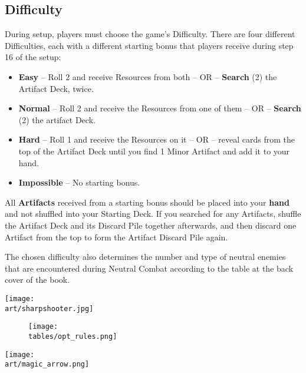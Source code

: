\begin{multicols}{2}

\subsection*{\hypertarget{Difficulty}{Difficulty}}
During setup, players must choose the game's Difficulty.
There are four different Difficulties, each with a different starting bonus that players receive during step 16 of the setup:
\begin{itemize}
  \item \textbf{Easy} – Roll 2  and receive Resources from both – OR – \textbf{Search} (2) the Artifact Deck, twice.
  \item \textbf{Normal} – Roll 2  and receive the Resources from one of them – OR – \textbf{Search} (2) the artifact Deck.
  \item \textbf{Hard} – Roll 1  and receive the Resources on it – OR – reveal cards from the top of the Artifact Deck until you find 1 Minor Artifact and add it to your hand.
  \item \textbf{Impossible} – No starting bonus.
\end{itemize}


All \textbf{Artifacts} received from a starting bonus should be placed into your \textbf{hand} and not shuffled into your Starting Deck.
If you searched for any Artifacts, shuffle the Artifact Deck and its Discard Pile together afterwards, and then discard one Artifact from the top to form the Artifact Discard Pile again.\par
The chosen difficulty also determines the number and type of neutral enemies that are encountered during Neutral Combat according to the table at the back cover of the book.

\end{multicols}

\vfill
\texttt{[image: \\art/sharpshooter.jpg]}

\clearpage

\begin{figure*}[!hb]
  \centering
  \texttt{[image: \\tables/opt\_rules.png]}
\end{figure*}

\begin{scaledfigure}[blanker]
  \centering
  \texttt{[image: \\art/magic\_arrow.png]}
\end{scaledfigure}
